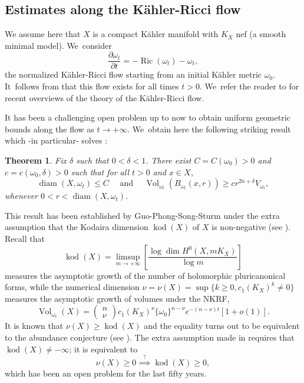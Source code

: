 \documentclass[10pt]{amsart}
\DeclareMathOperator{\diam}{diam}
\DeclareMathOperator{\kod}{kod}
\DeclareMathOperator{\Ric}{Ric}
\DeclareMathOperator{\Vol}{Vol}
\newtheorem{theorem}{Theorem}[section]
\theoremstyle{definition}
\begin{document}
\subsection{Estimates along the Kähler-Ricci flow} \label{sec:krf}

We assume here that $X$ is a compact Kähler manifold with $K_X$ nef (a smooth minimal model). We~consider
\[
\frac{\partial \omega_t}{\partial t}=-\Ric(\omega_t)-\omega_t,
\]
the normalized Kähler-Ricci flow starting from an initial Kähler metric $\omega_0$. It~follows from \cite{TZ06} that this flow exists for all times $t>0$. We~refer the reader to \cite{Tos18,Tos24} for recent overviews of the theory of the Kähler-Ricci flow.

It has been
a challenging open problem up to now to obtain uniform geometric bounds along the flow as $t \rightarrow +\infty$. We~obtain here the following striking result which -in particular- solves \cite[Conj.\,6.2]{Tos18}:

\begin{theorem} \label{thm:fkr}
Fix $\delta$ such that $0<\delta<1$.
There exist $C=C(\omega_0)>0$ and $c=c(\omega_0,\delta)>0$ such that for all $t>0$ and $x \in X$,
\[
\diam(X,\omega_t) \leq C
\quad \text{ and } \quad
\Vol_{\omega_t}(B_{\omega_t}(x,r)) \geq c r^{2n+\delta} V_{\omega_t},
\]
whenever $0<r<\diam(X,\omega_t)$.
\end{theorem}

This result has been established by Guo-Phong-Song-Sturm under the extra assumption that
the Kodaira dimension $\kod(X)$ of $X$ is non-negative (see \cite[Th.\,2.3]{GPSS22}).
Recall that
\[
\kod(X)=\limsup_{m \rightarrow+\infty} \left[ \frac{\log \dim H^0(X,mK_X)}{\log m} \right]
\]
measures the asymptotic growth of the number of holomorphic pluricanonical forms,
while the numerical dimension
$\nu=\nu(X)=\sup \{ k \geq 0, c_1(K_X)^k \neq 0 \}$
measures the asymptotic growth of volumes under the NKRF,
\begin{equation} \label{eq:volfkrn}
\Vol_{\omega_t}(X)=
\begin{pmatrix} n \\ \nu \end{pmatrix}
c_1(K_X)^{\nu} \{\omega_0\}^{n-\nu} e^{-(n-\nu)t} [1+o(1)].
\end{equation}
It is known that $\nu(X) \geq \kod(X)$ and the equality turns out to be equivalent to the abundance conjecture
(see \cite[Conj.\,6.3]{Tos18}).
The extra assumption made in \cite[Th.\,2.3]{GPSS22} requires that $\kod(X) \neq -\infty$;
it is equivalent to
\[
\nu(X) \geq 0 \stackrel{?}{\implies} \kod(X) \geq 0,
\]
which has been an open problem for the last fifty years.
\end{document}
